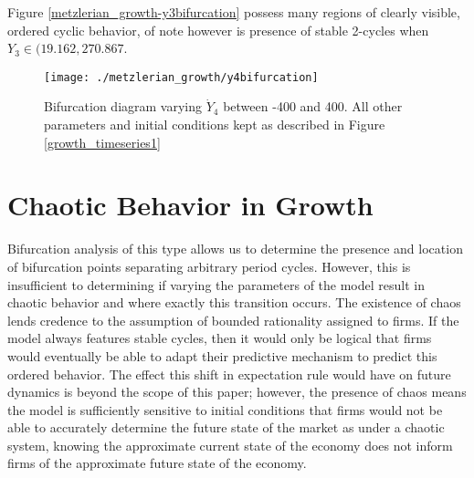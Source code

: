 Figure \ref{metzlerian_growth-y3bifurcation} possess many regions of clearly visible, ordered cyclic behavior, of note however is presence of stable 2-cycles when $Y_3\in (19.162, 270.867$.

\begin{figure}
    \centering
    \texttt{[image: ./metzlerian\_growth/y4bifurcation]}
    \caption{Bifurcation diagram varying $\dot Y_4$ between -400 and 400. All other parameters and initial conditions kept as described in Figure \ref{growth_timeseries1}}
    \label{metzlerian_growth-y4bifurcation}
\end{figure}

\section{Chaotic Behavior in Growth}
Bifurcation analysis of this type allows us to determine the presence and location of bifurcation points separating arbitrary period cycles. However, this is insufficient to determining if varying the parameters of the model result in chaotic behavior and where exactly this transition occurs. The existence of chaos lends credence to the assumption of bounded rationality assigned to firms. If the model always features stable cycles, then it would only be logical that firms would eventually be able to adapt their predictive mechanism to predict this ordered behavior. The effect this shift in expectation rule would have on future dynamics is beyond the scope of this paper; however, the presence of chaos means the model is sufficiently sensitive to initial conditions that firms would not be able to accurately determine the future state of the market as under a chaotic system, knowing the approximate current state of the economy does not inform firms of the approximate future state of the economy. 

